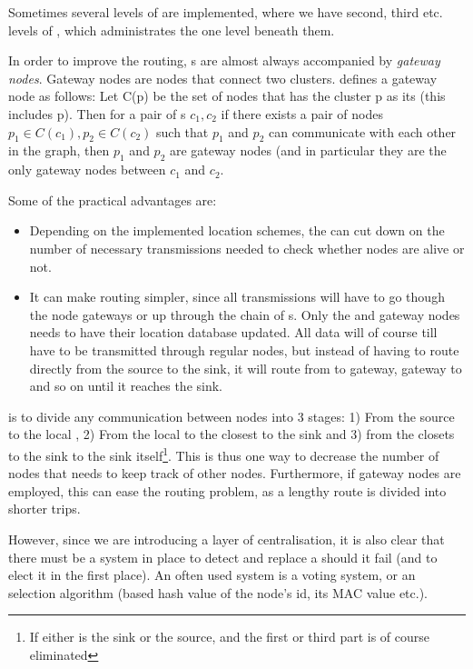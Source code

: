 \documentclass[letter, 12pt, english, draft]{article}
\begin{document}
Sometimes several levels of \ch are implemented, where we have second, third etc. levels of \ch, which administrates the \ch one level beneath them.  

In order to improve the routing, \ch s are almost always accompanied by \emph{gateway nodes}. Gateway nodes are nodes that connect two clusters. \cite{spanners} defines a gateway node as follows:
Let C(p) be the set of nodes that has the cluster p as its \ch (this includes p). Then for a pair of \ch s $c_1, c_2$ if there exists a pair of nodes $p_1 \in C(c_1), p_2 \in C(c_2)$ such that $p_1$ and $p_2$ can communicate with each other in the graph, then $p_1$ and $p_2$ are gateway nodes (and in particular they are the only gateway nodes between $c_1$ and $c_2$.  

Some of the practical advantages are:
\begin{itemize}
\item Depending on the implemented location schemes, the \ch can cut down on the number of necessary transmissions needed to check whether nodes are alive or not.
\item It can make routing simpler, since all transmissions will have to go though the node gateways or up through the chain of \ch s. Only the \ch and gateway nodes needs to have their location database updated. All data will of course till have to be transmitted through regular nodes, but instead of having to route directly from the source to the sink, it will route from \ch to gateway, gateway to \ch and so on until it reaches the sink.
\end{itemize}

\ch is to divide any communication between nodes into 3 stages: 1) From the source to the local \ch, 2) From the local \ch to the \ch closest to the sink and 3) from the \ch closets to the sink to the sink itself\footnote{If either \ch is the sink or the source, and the first or third part is of course eliminated}. This is thus one way to decrease the number of nodes that needs to keep track of other nodes. Furthermore, if gateway nodes are employed, this can ease the routing problem, as a lengthy route is divided into shorter trips.  

However, since we are introducing a layer of centralisation, it is also clear that there must be a system in place to detect and replace a \ch should it fail (and to elect it in the first place). An often used system is a voting system, or an selection algorithm (based hash value of the node's id, its MAC value etc.). 


{}
\end{document}
